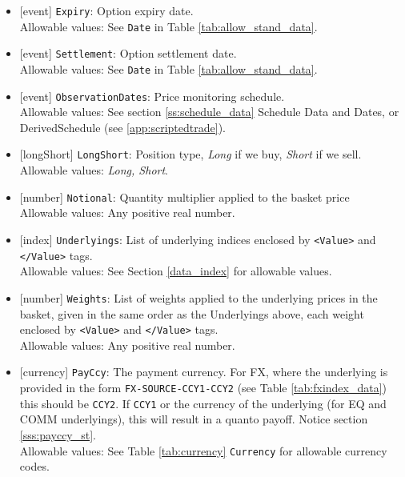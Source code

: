 \begin{itemize}
    \item{}[event] \lstinline!Expiry!: Option expiry date. \\
    Allowable values: See \lstinline!Date! in Table \ref{tab:allow_stand_data}.
    \item{}[event] \lstinline!Settlement!: Option settlement date. \\
    Allowable values: See \lstinline!Date! in Table \ref{tab:allow_stand_data}.
    \item{}[event] \lstinline!ObservationDates!: Price monitoring schedule. \\
    Allowable values: See section \ref{ss:schedule_data} Schedule Data and Dates, or DerivedSchedule (see \ref{app:scriptedtrade}).
    \item{}[longShort] \lstinline!LongShort!: Position type,
          {\em Long} if we buy, {\em Short} if we sell.\\
    Allowable values: \emph{Long, Short}.
        \item{}[number] \lstinline!Notional!: Quantity multiplier applied to the
          basket price \\
          Allowable values: Any positive real number.
    \item{}[index] \lstinline!Underlyings!: List of underlying indices
          enclosed by {\tt <Value>} and {\tt </Value>} tags. \\
          Allowable values: See Section \ref{data_index} for allowable values.
    \item{}[number] \lstinline!Weights!: List of weights applied to the
          underlying prices in the basket, given in the same order as
          the Underlyings above, each weight enclosed by {\tt <Value>} and {\tt </Value>} tags.\\
          Allowable values: Any positive real number.
    \item{}[currency] \lstinline!PayCcy!: The payment currency. For FX, where the underlying is provided
      in the form \lstinline!FX-SOURCE-CCY1-CCY2! (see Table \ref{tab:fxindex_data}) this should
      be \lstinline!CCY2!. If \lstinline!CCY1! or the currency of the underlying (for EQ and
      COMM underlyings), this will result in a quanto payoff. Notice section \ref{sss:payccy_st}. \\
        Allowable values: See Table \ref{tab:currency} \lstinline!Currency! for allowable currency codes.
\end{itemize}